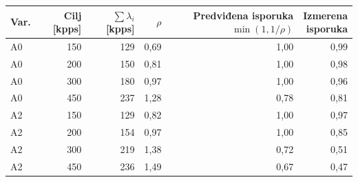 \begin{tabular}{@{}lrrrrr@{}}
\toprule
Var. & Cilj [kpps] & $\sum\lambda_i$ [kpps] & $\rho$ & \makecell{Predviđena\\isporuka $\min(1,1/\rho)$} & \makecell{Izmerena\\isporuka} \\
\midrule
A0 & 150 & 129 & 0{,}69 & 1{,}00 & 0{,}99 \\
A0 & 200 & 150 & 0{,}81 & 1{,}00 & 0{,}98 \\
A0 & 300 & 180 & 0{,}97 & 1{,}00 & 0{,}96 \\
A0 & 450 & 237 & 1{,}28 & 0{,}78 & 0{,}81 \\
\midrule
A2 & 150 & 129 & 0{,}82 & 1{,}00 & 0{,}97 \\
A2 & 200 & 154 & 0{,}97 & 1{,}00 & 0{,}85 \\
A2 & 300 & 219 & 1{,}38 & 0{,}72 & 0{,}51 \\
A2 & 450 & 236 & 1{,}49 & 0{,}67 & 0{,}47 \\
\bottomrule
\end{tabular}
